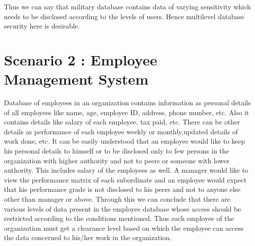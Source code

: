 \documentclass[11pt,a4paper]{report}
\begin{document}
Thus we can say that military database contains data of varying sensitivity which needs to be disclosed according to the levels of users. Hence multilevel database security here is desirable.



\section{Scenario 2 : Employee Management System }
Database of employees in an organization contains information as personal details of all employees like name, age, employee ID, address, phone number, etc. 
Also it contains details like salary of each employee, tax paid, etc. There can be other details as performance of each employee weekly or monthly,updated details of work done, etc. It can be easily understood that an employee would like to keep his personal details to himself or to be disclosed only to few persons in the organization with higher authority and not to peers or someone with lower authority. This includes salary of the employees as well. A manager would like to view the performance matrix of each subordinate and an employee would expect that his performance grade is not disclosed to his peers and not to anyone else other than manager or above. Through this we can conclude that there are various levels of data present in the employee database whose access should be restricted according to the conditions mentioned. Thus each employee of the organization must get a clearance level based on which the employee can access the data concerned to his/her work in the organization. 
\end{document}
